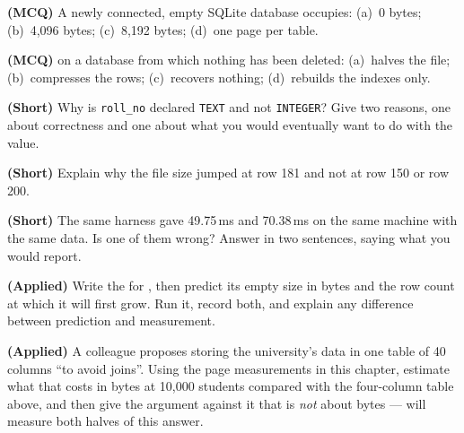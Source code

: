 \begin{reviewq}
  \item \textbf{(MCQ)} A newly connected, empty SQLite database occupies:
        (a)~0 bytes; (b)~4{,}096 bytes; (c)~8{,}192 bytes; (d)~one page per
        table.
  \item \textbf{(MCQ)}  on a database from which nothing has been
        deleted: (a)~halves the file; (b)~compresses the rows;
        (c)~recovers nothing; (d)~rebuilds the indexes only.
  \item \textbf{(Short)} Why is \texttt{roll\_no} declared \texttt{TEXT} and
        not \texttt{INTEGER}? Give two reasons, one about correctness and one
        about what you would eventually want to do with the value.
  \item \textbf{(Short)} Explain why the file size jumped at row 181 and not at
        row 150 or row 200.
  \item \textbf{(Short)} The same harness gave 49.75\,ms and 70.38\,ms on the
        same machine with the same data. Is one of them wrong? Answer in two
        sentences, saying what you would report.
  \item \textbf{(Applied)} Write the  for
        , then predict its empty size in bytes and the row count at
        which it will first grow. Run it, record both, and explain any
        difference between prediction and measurement.
  \item \textbf{(Applied)} A colleague proposes storing the university's data
        in one table of 40 columns ``to avoid joins''. Using the page
        measurements in this chapter, estimate what that costs in bytes at
        10{,}000 students compared with the four-column table above, and then
        give the argument against it that is \emph{not} about bytes ---
         will measure both halves of this answer.
\end{reviewq}
